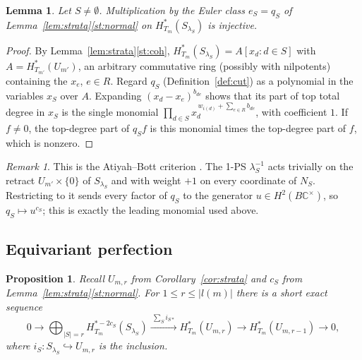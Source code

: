 \documentclass[11pt]{amsart}
\newtheorem{proposition}[theorem]{Proposition}
\newtheorem{lemma}[theorem]{Lemma}
\theoremstyle{definition}
\theoremstyle{remark}
\newtheorem{remark}[theorem]{Remark}
\numberwithin{equation}{section}
\newcommand{\C}{\mathbb{C}}
\begin{document}
\begin{lemma}\label{lem:AB}
Let $S\neq\emptyset$. Multiplication by the Euler class $e_S=q_S$ of Lemma~\ref{lem:strata}\ref{st:normal}
on $H^*_{T_m}(S_{\lambda_S})$ is injective.
\end{lemma}

\begin{proof}
By Lemma~\ref{lem:strata}\ref{st:coh}, $H^*_{T_m}(S_{\lambda_S})=A[x_d:d\in S]$ with
$A=H^*_{T_{m'}}(U_{m'})$, an arbitrary commutative ring (possibly with nilpotents) containing the $x_e$,
$e\in R$. Regard $q_S$ (Definition~\ref{def:cut}) as a polynomial in the variables $x_S$ over $A$.
Expanding $(x_d-x_e)^{b_{de}}$ shows that its part of top total degree in $x_S$ is the single monomial
$\prod_{d\in S}x_d^{\,w_{i(d)}+\sum_{e\in R}b_{de}}$, with coefficient $1$. If $f\neq0$, the top-degree
part of $q_Sf$ is this monomial times the top-degree part of $f$, which is nonzero.
\end{proof}

\begin{remark}
This is the Atiyah--Bott criterion \cite{AB}. The 1-PS $\lambda_S^{-1}$ acts trivially on the retract
$U_{m'}\times\{0\}$ of $S_{\lambda_S}$ and with weight $+1$ on every coordinate of $N_S$. Restricting to
it sends every factor of $q_S$ to the generator $u\in H^2(B\C^\times)$, so $q_S\mapsto u^{c_S}$; this is
exactly the leading monomial used above.
\end{remark}

\subsection{Equivariant perfection}\label{subsec:perfect}

\begin{proposition}\label{prop:perfect}
Recall $U_{m,r}$ from Corollary~\ref{cor:strata} and $c_S$ from Lemma~\ref{lem:strata}\ref{st:normal}.
For $1\le r\le|l(m)|$ there is a short exact sequence
\[
  0\to\bigoplus_{|S|=r}H^{*-2c_S}_{T_m}(S_{\lambda_S})\xrightarrow{\ \sum_Si_{S*}\ }H^*_{T_m}(U_{m,r})
  \to H^*_{T_m}(U_{m,r-1})\to0 ,
\]
where $i_S:S_{\lambda_S}\hookrightarrow U_{m,r}$ is the inclusion.
\end{proposition}
\end{document}
